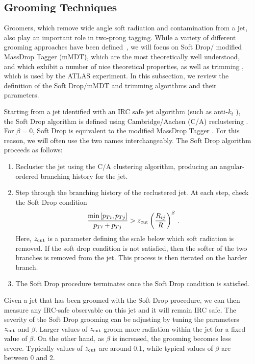 \documentclass[11pt,letterpaper]{article}
\newcommand{\zcut}{z_{\rm cut}}
\begin{document}
\subsection{Grooming Techniques}\label{sec:groom_tech}




Groomers, which remove wide angle soft radiation and contamination from a jet, also play an important role in two-prong tagging.
%
While a variety of different grooming approaches have been defined~\cite{Butterworth:2008iy,Ellis:2009su,Ellis:2009me,Krohn:2009th,Dasgupta:2013via,Dasgupta:2013ihk}, we will focus on Soft Drop/ modified MassDrop Tagger (mMDT), which are the most theoretically well understood, and which exhibit a number of nice theoretical properties, as well as trimming \cite{Krohn:2009th}, which is used by the ATLAS experiment.
%
In this subsection, we review the definition of the Soft Drop/mMDT and trimming algorithms and their parameters.

Starting from a jet identified with an IRC safe jet algorithm (such as
anti-$k_t$ \cite{Cacciari:2008gp}), the Soft Drop algorithm is defined
using Cambridge/Aachen (C/A) reclustering
\cite{Dokshitzer:1997in,Wobisch:1998wt,Wobisch:2000dk}.
%
For $\beta = 0$, Soft Drop is equivalent to the modified MassDrop Tagger \cite{Dasgupta:2013ihk}. For this reason, we will often use the two names interchangeably.
%
The Soft Drop algorithm proceeds as follows:
%
\begin{enumerate}
%
\item Recluster the jet using the C/A clustering algorithm, producing an angular-ordered branching history for the jet.
%
\item Step through the branching history of the reclustered jet.  At each step, check the Soft Drop condition
\begin{align}\label{eq:sd_cut}
\frac{\min\left[ p_{Ti}, p_{Tj}  \right]}{p_{Ti}+p_{Tj}}> \zcut \left(   \frac{R_{ij}}{R}\right)^\beta \,.
\end{align}
Here, $\zcut$ is a parameter defining the scale below which soft radiation is removed.  If the soft drop condition is not satisfied, then the softer of the two branches is removed from the jet.  This process is then iterated on the harder branch.
%
\item The Soft Drop procedure terminates once the Soft Drop condition is satisfied.
%
\end{enumerate}
%
Given a jet that has been groomed with the Soft Drop procedure, we can
then measure any IRC-safe observable on this jet and it will remain
IRC safe.
%
The severity of the Soft Drop grooming can be adjusting by
tuning the parameters $\zcut$ and $\beta$.
%
Larger values of $\zcut$ groom more radiation within the jet for a fixed value of $\beta$.
%
On the other hand, as $\beta$ is increased, the grooming becomes less
severe.
%
Typically values of $\zcut$ are around $0.1$, while typical
values of $\beta$ are between $0$ and $2$.
\end{document}
